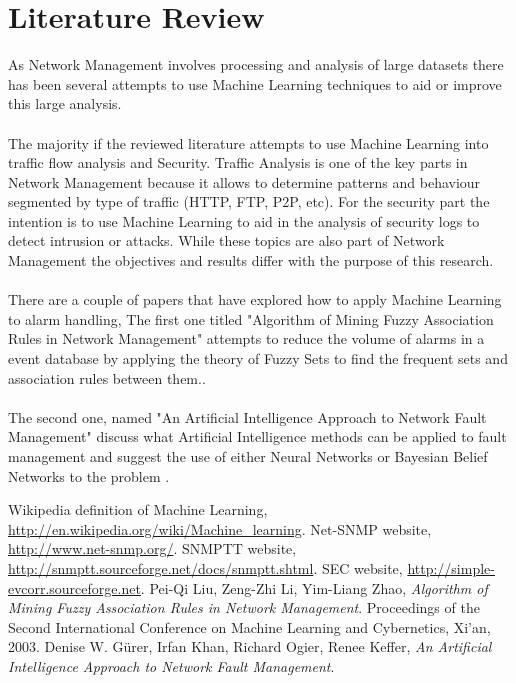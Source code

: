 \documentclass[10pt,a4paper]{article}
\begin{document}
  \section{Literature Review}
As Network Management involves processing and analysis of large datasets there has been several attempts to use Machine Learning techniques to aid or improve this large analysis.
\\\\
The majority if the reviewed literature attempts to use Machine Learning into traffic flow analysis and Security. Traffic Analysis is one of the key parts in Network Management because it allows to determine patterns and behaviour segmented by type of traffic (HTTP, FTP, P2P, etc). For the security part the intention is to use Machine Learning to aid in the analysis of security logs to detect intrusion or attacks. While these topics are also part of Network Management the objectives and results differ with the purpose of this research.
\\\\
There are a couple of papers that have explored how to apply Machine Learning to alarm handling, The first one titled "Algorithm of Mining Fuzzy Association Rules in Network Management" attempts to reduce the volume of alarms in a event database by applying the theory of Fuzzy Sets to find the frequent sets and association rules between them.\cite{liu2003}.
\\\\
The second one, named "An Artificial Intelligence Approach to Network Fault Management" discuss what Artificial Intelligence methods can be applied to fault management and suggest the use of either Neural Networks or Bayesian Belief Networks to the problem \cite{kefferundef}.

\begin{thebibliography}{9}

 Wikipedia definition of Machine Learning, \url{http://en.wikipedia.org/wiki/Machine_learning}.
Net-SNMP website, \url{http://www.net-snmp.org/}.
SNMPTT website, \url{http://snmptt.sourceforge.net/docs/snmptt.shtml}.
SEC website, \url{http://simple-evcorr.sourceforge.net}.
  Pei-Qi Liu, Zeng-Zhi Li, Yim-Liang Zhao,
  \emph{Algorithm of Mining Fuzzy Association Rules in Network Management}.
  Proceedings of the Second International Conference on Machine Learning and Cybernetics, Xi'an,
  2003.
  Denise W. Gürer, Irfan Khan, Richard Ogier, Renee Keffer,
  \emph{An Artificial Intelligence Approach to Network Fault Management}.
  
\end{thebibliography}
    
\end{document}
